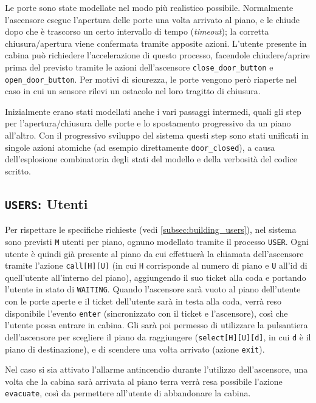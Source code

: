 Le porte sono state modellate nel modo più realistico possibile.
Normalmente l'ascensore esegue l'apertura delle porte una volta arrivato al piano, e le chiude dopo che è trascorso un certo intervallo di tempo (\emph{timeout}); la corretta chiusura/apertura viene confermata tramite apposite azioni.
L'utente presente in cabina può richiedere l'accelerazione di questo processo, facendole chiudere/aprire prima del previsto tramite le azioni dell'ascensore \texttt{close\_door\_button} e \texttt{open\_door\_button}.
Per motivi di sicurezza, le porte vengono però riaperte nel caso in cui un sensore rilevi un ostacolo nel loro tragitto di chiusura.

Inizialmente erano stati modellati anche i vari passaggi intermedi, quali gli step per l'apertura/chiusura delle porte e lo spostamento progressivo da un piano all'altro.
Con il progressivo sviluppo del sistema questi step sono stati unificati in singole azioni atomiche (ad esempio direttamente \texttt{door\_closed}), a causa dell'esplosione combinatoria degli stati del modello e della verbosità del codice scritto.

\subsection{\texttt{USERS}: Utenti}
Per rispettare le specifiche richieste (vedi \cref{subsec:building_users}), nel sistema sono previsti \texttt{M} utenti per piano, ognuno modellato tramite il processo \texttt{USER}.
Ogni utente è quindi già presente al piano da cui effettuerà la chiamata dell'ascensore tramite l'azione \texttt{call[H][U]} (in cui \texttt{H} corrisponde al numero di piano e \texttt{U} all'id di quell'utente all'interno del piano), aggiungendo il suo ticket alla coda e portando l'utente in stato di \texttt{WAITING}.
Quando l'ascensore sarà vuoto al piano dell'utente con le porte aperte e il ticket dell'utente sarà in testa alla coda, verrà reso disponibile l'evento \texttt{enter} (sincronizzato con il ticket e l'ascensore), così che l'utente possa entrare in cabina.
Gli sarà poi permesso di utilizzare la pulsantiera dell'ascensore per scegliere il piano da raggiungere (\texttt{select[H][U][d]}, in cui \texttt{d} è il piano di destinazione), e di scendere una volta arrivato (azione \texttt{exit}).

Nel caso si sia attivato l'allarme antincendio durante l'utilizzo dell'ascensore, una volta che la cabina sarà arrivata al piano terra verrà resa possibile l'azione \texttt{evacuate}, così da permettere all'utente di abbandonare la cabina.

